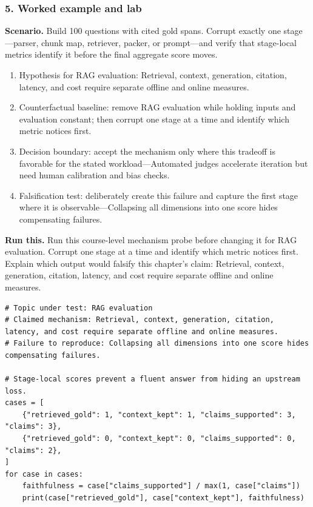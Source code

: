\subsubsection*{5. Worked example and lab}
\textbf{Scenario.} Build 100 questions with cited gold spans. Corrupt exactly one stage—parser, chunk map, retriever, packer, or prompt—and verify that stage-local metrics identify it before the final aggregate score moves.
\begin{enumerate}
\item Hypothesis for RAG evaluation: Retrieval, context, generation, citation, latency, and cost require separate offline and online measures.
\item Counterfactual baseline: remove RAG evaluation while holding inputs and evaluation constant; then corrupt one stage at a time and identify which metric notices first.
\item Decision boundary: accept the mechanism only where this tradeoff is favorable for the stated workload—Automated judges accelerate iteration but need human calibration and bias checks.
\item Falsification test: deliberately create this failure and capture the first stage where it is observable—Collapsing all dimensions into one score hides compensating failures.
\end{enumerate}
\textbf{Run this.} Run this course-level mechanism probe before changing it for RAG evaluation. Corrupt one stage at a time and identify which metric notices first. Explain which output would falsify this chapter's claim: Retrieval, context, generation, citation, latency, and cost require separate offline and online measures.
\begin{Verbatim}[fontsize=\scriptsize]
# Topic under test: RAG evaluation
# Claimed mechanism: Retrieval, context, generation, citation, latency, and cost require separate offline and online measures.
# Failure to reproduce: Collapsing all dimensions into one score hides compensating failures.

# Stage-local scores prevent a fluent answer from hiding an upstream loss.
cases = [
    {"retrieved_gold": 1, "context_kept": 1, "claims_supported": 3, "claims": 3},
    {"retrieved_gold": 0, "context_kept": 0, "claims_supported": 0, "claims": 2},
]
for case in cases:
    faithfulness = case["claims_supported"] / max(1, case["claims"])
    print(case["retrieved_gold"], case["context_kept"], faithfulness)
\end{Verbatim}
